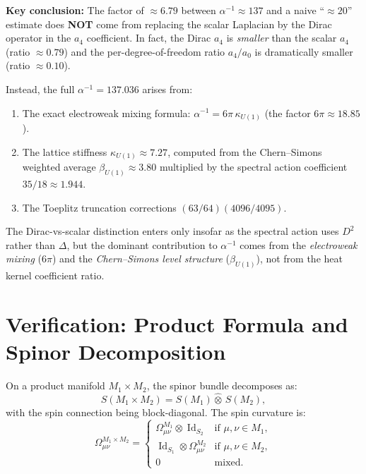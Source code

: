 \documentclass[12pt,a4paper]{article}
\theoremstyle{definition}
\DeclareMathOperator{\Id}{Id}
\begin{document}
\begin{tcolorbox}[colback=blue!5!white, colframe=blue!50!black]
\textbf{Key conclusion:} The factor of $\approx 6.79$ between
$\alpha^{-1} \approx 137$ and a naive ``$\approx 20$'' estimate does
\textbf{NOT} come from replacing the scalar Laplacian by the Dirac
operator in the $a_4$ coefficient.  In fact, the Dirac $a_4$ is
\emph{smaller} than the scalar $a_4$ (ratio $\approx 0.79$) and
the per-degree-of-freedom ratio $a_4/a_0$ is dramatically smaller
(ratio $\approx 0.10$).

Instead, the full $\alpha^{-1} = 137.036$ arises from:
\begin{enumerate}
\item The exact electroweak mixing formula: $\alpha^{-1} = 6\pi\,
  \kappa_{U(1)}$ (the factor $6\pi \approx 18.85$).
\item The lattice stiffness $\kappa_{U(1)} \approx 7.27$, computed
  from the Chern--Simons weighted average $\beta_{U(1)} \approx
  3.80$ multiplied by the spectral action coefficient $35/18 \approx
  1.944$.
\item The Toeplitz truncation corrections $(63/64)(4096/4095)$.
\end{enumerate}

The Dirac-vs-scalar distinction enters only insofar as the spectral
action uses $D^2$ rather than $\Delta$, but the dominant contribution
to $\alpha^{-1}$ comes from the \emph{electroweak mixing} ($6\pi$)
and the \emph{Chern--Simons level structure} ($\beta_{U(1)}$), not
from the heat kernel coefficient ratio.
\end{tcolorbox}


\section{Verification: Product Formula and Spinor Decomposition}
\label{sec:verification}

On a product manifold $M_1 \times M_2$, the spinor bundle
decomposes as:
\begin{equation}
S(M_1 \times M_2) = S(M_1) \hat{\otimes}\, S(M_2),
\end{equation}
with the spin connection being block-diagonal.  The spin curvature
is:
\begin{equation}
\Omega^{M_1 \times M_2}_{\mu\nu} = \begin{cases}
\Omega^{M_1}_{\mu\nu} \otimes \Id_{S_2} & \text{if } \mu,\nu \in M_1, \\
\Id_{S_1} \otimes \Omega^{M_2}_{\mu\nu} & \text{if } \mu,\nu \in M_2, \\
0 & \text{mixed.}
\end{cases}
\end{equation}
\end{document}
